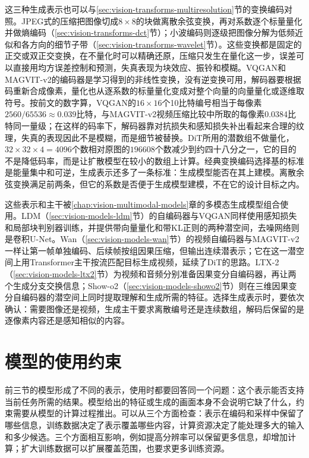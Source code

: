 这三种生成表示也可以与\ref{sec:vision-transforms-multiresolution}节的变换编码对照。JPEG式的压缩把图像切成$8\times8$的块做离散余弦变换，再对系数逐个标量量化并做熵编码（\ref{sec:vision-transforms-dct}节）；小波编码则逐级把图像分解为低频近似和各方向的细节子带（\ref{sec:vision-transforms-wavelet}节）。这些变换都是固定的正交或双正交变换，在不量化时可以精确还原，压缩只发生在量化这一步，误差可以直接用均方误差控制和预测，失真表现为块效应、振铃和模糊。VQGAN和MAGVIT-v2的编码器是学习得到的非线性变换，没有逆变换可用，解码器要根据码重新合成像素，量化也从逐系数的标量量化变成对整个向量的向量量化或逐维取符号。按前文的数字算，VQGAN的$16\times16$个10比特编号相当于每像素$2560/65536\approx0.039$比特，与MAGVIT-v2视频压缩比较中所取的每像素0.0384比特同一量级；在这样的码率下，解码器靠对抗损失和感知损失补出看起来合理的纹理，失真的表现因此不是模糊，而是细节被替换。DiT所用的潜数组不做量化，$32\times32\times4=4096$个数相对原图的$196608$个数减少到约四十八分之一，它的目的不是降低码率，而是让扩散模型在较小的数组上计算。经典变换编码选择基的标准是能量集中和可逆，生成表示还多了一条标准：生成模型能否在其上建模。离散余弦变换满足前两条，但它的系数是否便于生成模型建模，不在它的设计目标之内。

这些表示和主干被\ref{chap:vision-multimodal-models}章的多模态生成模型组合使用。LDM（\ref{sec:vision-models-ldm}节）的自编码器与VQGAN同样使用感知损失和局部块判别器训练，并提供带向量量化和带KL正则的两种潜空间，去噪网络则是卷积U-Net。Wan（\ref{sec:vision-models-wan}节）的视频自编码器与MAGVIT-v2一样让第一帧单独编码、后续帧按组因果压缩，但输出连续潜表示；它在这一潜空间上用Transformer主干按流匹配目标生成视频，延续了DiT的思路。LTX-2（\ref{sec:vision-models-ltx2}节）为视频和音频分别准备因果变分自编码器，再让两个生成分支交换信息；Show-o2（\ref{sec:vision-models-showo2}节）则在三维因果变分自编码器的潜空间上同时提取理解和生成所需的特征。选择生成表示时，要依次确认：需要图像还是视频，生成主干要求离散编号还是连续数组，解码后保留的是逐像素内容还是感知相似的内容。

\section{模型的使用约束}
\label{sec:vision-ivm-constraints}

前三节的模型形成了不同的表示，使用时都要回答同一个问题：这个表示能否支持当前任务所需的结果。模型给出的特征或生成的画面本身不会说明它缺了什么，约束需要从模型的计算过程推出。可以从三个方面检查：表示在编码和采样中保留了哪些信息，训练数据决定了表示覆盖哪些内容，计算资源决定了能处理多大的输入和多少候选。三个方面相互影响，例如提高分辨率可以保留更多信息，却增加计算；扩大训练数据可以扩展覆盖范围，也要求更多训练资源。

